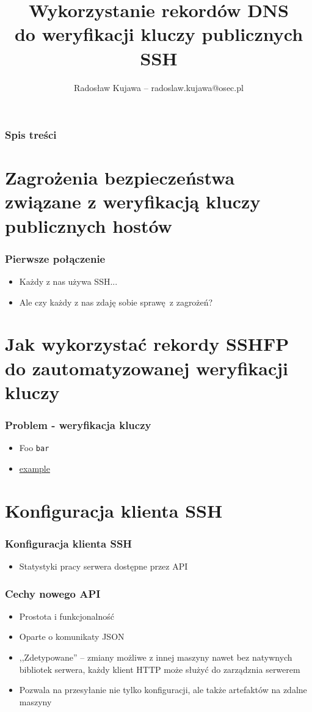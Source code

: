 \documentclass[dvipsnames,table]{beamer}
\title{Wykorzystanie rekordów DNS \\ do weryfikacji kluczy publicznych SSH}
\author{Radosław Kujawa -- radoslaw.kujawa@osec.pl}
\institute{OSEC}
\begin{document}
\begin{frame}
\titlepage
\end{frame}

\begin{frame}[allowframebreaks]
\frametitle{Spis treści}
{
\hypersetup{colorlinks=true,linkcolor=black,urlcolor=OSEC-red}
\tableofcontents
}
\end{frame}


\section{Zagrożenia bezpieczeństwa związane z weryfikacją kluczy publicznych hostów}

\begin{frame}
\frametitle{Pierwsze połączenie}
\begin{itemize}
	\item Każdy z nas używa SSH...
	\item Ale czy każdy z nas zdaję sobie sprawę z zagrożeń? 
\end{itemize}
\end{frame}

\section{Jak wykorzystać rekordy SSHFP do zautomatyzowanej weryfikacji kluczy}

\begin{frame}
\frametitle{Problem - weryfikacja kluczy}
\begin{itemize}
	\item Foo {\tt bar}
	\item \href{http://example.com/}{example}
\end{itemize}
\end{frame}

\section{Konfiguracja klienta SSH}

\begin{frame}
\frametitle{Konfiguracja klienta SSH}
\begin{itemize}
	\item Statystyki pracy serwera dostępne przez API
\end{itemize}
\end{frame}

\begin{frame}
\frametitle{Cechy nowego API}
\begin{itemize}
	\item Prostota i funkcjonalność
	\item Oparte o komunikaty JSON
	\item ,,Zdetypowane'' -- zmiany możliwe z innej maszyny nawet bez natywnych bibliotek serwera, każdy klient HTTP może służyć do zarządznia serwerem
	\item Pozwala na przesyłanie nie tylko konfiguracji, ale także artefaktów na zdalne maszyny
\end{itemize}
\end{frame}
\end{document}
